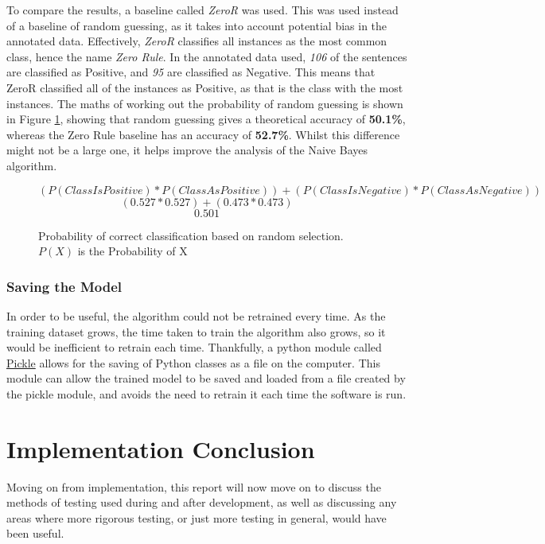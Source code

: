 To compare the results, a baseline called \emph{ZeroR}\cite{ZeroR2016} was used. This was used instead of a baseline of random guessing, as it takes into account potential bias in the annotated data. Effectively, \emph{ZeroR} classifies all instances as the most common class, hence the name \emph{Zero Rule}. In the annotated data used, \emph{106} of the sentences are classified as Positive, and \emph{95} are classified as Negative. This means that ZeroR classified all of the instances as Positive, as that is the class with the most instances. The maths of working out the probability of random guessing is shown in Figure \ref{fig:random_prob}, showing that random guessing gives a theoretical accuracy of \textbf{50.1\%}, whereas the Zero Rule baseline has an accuracy of \textbf{52.7\%}. Whilst this difference might not be a large one, it helps improve the analysis of the Naive Bayes algorithm.

\begin{figure}[ht]
$$(P(Class Is Positive)*P(Class As Positive))+(P(Class Is Negative)*P(Class As Negative)) $$
$$(0.527*0.527)+(0.473*0.473)$$
$$0.501$$
\caption{Probability of correct classification based on random selection. $P(X)$ is the Probability of X}
\label{fig:random_prob}
\end{figure}


\subsubsection{Saving the Model}

In order to be useful, the algorithm could not be retrained every time. As the training dataset grows, the time taken to train the algorithm also grows, so it would be inefficient to retrain each time. Thankfully, a python module called \href{https://docs.python.org/3/library/pickle.html}{Pickle} allows for the saving of Python classes as a file on the computer. This module can allow the trained model to be saved and loaded from a file created by the pickle module, and avoids the need to retrain it each time the software is run.

\section{Implementation Conclusion}

Moving on from implementation, this report will now move on to discuss the methods of testing used during and after development, as well as discussing any areas where more rigorous testing, or just more testing in general, would have been useful.